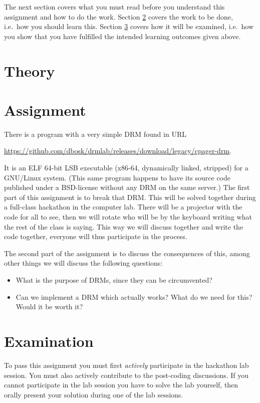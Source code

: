 The next section covers what you must read before you understand this 
assignment and how to do the work.
Section \ref{sec:tasks} covers the work to be done, i.e.~how you should learn 
this.
Section \ref{sec:exam} covers how it will be examined, i.e.~how you show that 
you have fulfilled the intended learning outcomes given above.


\section{Theory}
\label{sec:reading}



\section{Assignment}
\label{sec:tasks}
There is a program with a very simple \ac{DRM} found in URL
\begin{center}
  \url{https://github.com/dbosk/drmlab/releases/download/legacy/cpager-drm}.
\end{center}
It is an ELF 64-bit LSB executable (x86-64, dynamically linked, stripped) for 
a GNU/Linux system.
(This same program happens to have its source code published under 
a BSD-license without any \ac{DRM} on the same server.)
The first part of this assignment is to break that \ac{DRM}.
This will be solved together during a full-class hackathon in the computer lab.
There will be a projector with the code for all to see, then we will rotate who 
will be by the keyboard writing what the rest of the class is saying.
This way we will discuss together and write the code together, everyone will 
thus participate in the process.

The second part of the assignment is to discuss the consequences of this, among 
other things we will discuss the following questions:
\begin{itemize}
  \item What is the purpose of \acp{DRM}, since they can be circumvented?
  \item Can we implement a \ac{DRM} which actually works?
    What do we need for this?
    Would it be worth it?
\end{itemize}


\section{Examination}
\label{sec:exam}
To pass this assignment you must first \emph{actively} participate in the 
hackathon lab session.
You must also actively contribute to the post-coding discussions.
If you cannot participate in the lab session you have to solve the lab 
yourself, then orally present your solution during one of the lab sessions.



